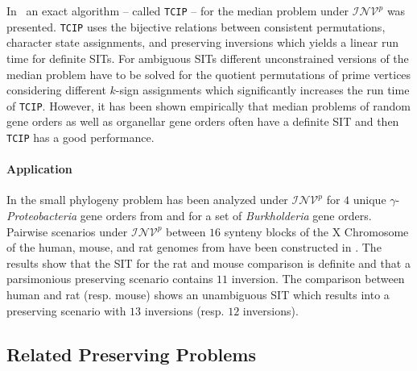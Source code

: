 \documentclass{svmult}
\newcommand{\m}[1]{\mathcal{#1}}
\begin{document}

In~\cite{Bernt_2008} an exact algorithm -- called \texttt{TCIP} -- for the median problem under $\m{INV}^p$ was presented.
\texttt{TCIP} uses the bijective relations between consistent permutations, character state assignments, and preserving inversions 
which yields a linear run time for definite SITs.
For ambiguous SITs different unconstrained versions of the median problem 
have to be solved for the quotient permutations of prime vertices considering 
different $k$-sign assignments which significantly increases the run time of \texttt{TCIP}.
However, it has been shown empirically that median problems of random gene orders as well as organellar 
gene orders often have a definite SIT and then \texttt{TCIP} has a good performance.

\paragraph{Application}
In \cite{Bernt_2012} the small phylogeny problem has been analyzed under $\m{INV}^p$ for $4$ 
unique $\gamma$-\emph{Proteobacteria} gene orders from \cite{Belda_2005} and for a
set of \emph{Burkholderia} gene orders.
Pairwise scenarios under $\m{INV}^p$ between $16$ synteny
blocks of the X Chromosome of the human, mouse, and rat genomes from \cite{Gibbs_2004}
have been constructed in \cite{Berard_2007}. The results show that the SIT for
the rat and mouse comparison is definite and that a parsimonious preserving
scenario contains $11$ inversion. The comparison between human and rat
(resp. mouse) shows an unambiguous SIT which results into a
preserving scenario with $13$ inversions (resp. $12$ inversions).



\subsection{Related Preserving Problems}
\label{sec:CREX}
\end{document}
